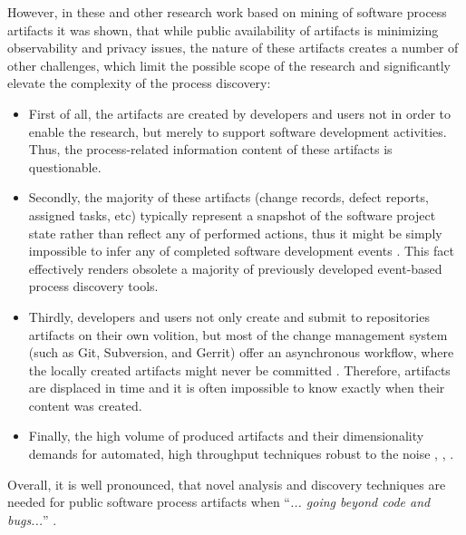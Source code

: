 However, in these and other research work based on mining of software process artifacts it was shown, 
that while public availability of artifacts is minimizing observability and privacy issues, the nature 
of these artifacts creates a number of other challenges, which limit the possible scope of the research 
and significantly elevate the complexity of the process discovery:
\begin{itemize}
\item First of all, the artifacts are created by developers and users not in order to enable the research,
but merely to support software development activities. Thus, the process-related information content of these
artifacts is questionable.
\item Secondly, the majority of these artifacts (change records, defect reports, assigned tasks, etc) 
typically represent a snapshot of the software project state rather than reflect any of performed actions, 
thus it might be simply impossible to infer any of completed software development events \cite{citeulike:1296888}.
This fact effectively renders obsolete a majority of previously developed event-based process discovery tools.
\item Thirdly, developers and users not only create and submit to repositories artifacts on their own volition,
but most of the change management system (such as Git, Subversion, and Gerrit) offer an asynchronous workflow, 
where the locally created artifacts might never be committed \cite{citeulike:2280690} \cite{citeulike:9037939}. 
Therefore, artifacts are displaced in time and it is often impossible to know exactly when their content was created.
\item Finally, the high volume of produced artifacts and their dimensionality demands for automated, high throughput 
techniques robust to the noise \cite{citeulike:12550438}, \cite{citeulike:7853299}, \cite{citeulike:4534888}.
\end{itemize}
Overall, it is well pronounced, that novel analysis and discovery techniques are needed for public software process
artifacts when ``\textit{... going beyond code and bugs...}'' \cite{citeulike:7853299}.

